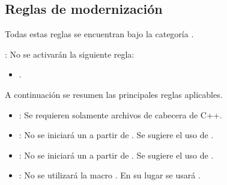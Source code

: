 \subsection{Reglas de modernización}

Todas estas reglas se encuentran bajo la categoría .

: No se activarán la siguiente regla:
\begin{itemize}

\item {}.

\end{itemize}

A continuación se resumen las principales reglas aplicables.

\begin{itemize}

\item {}:
Se requieren solamente archivos de cabecera de C++.

\item {}:
No se iniciará un  a partir de .
Se sugiere el uso de .

\item {}:
No se iniciará un  a partir de .
Se sugiere el uso de .

\item {}:
No se utilizará la macro .
En su lugar se usará .


\end{itemize}
